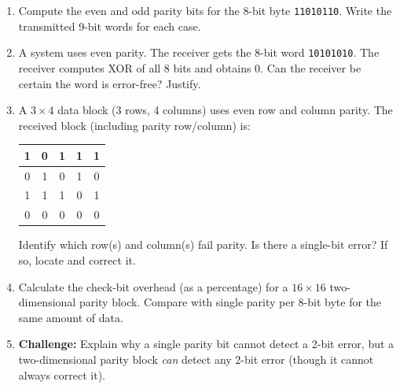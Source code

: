 \documentclass[11pt]{article}
\begin{document}
\begin{exercice}
\begin{enumerate}
\item Compute the even and odd parity bits for the 8-bit byte \texttt{11010110}. Write the transmitted 9-bit words for each case.
\item A system uses even parity. The receiver gets the 8-bit word \texttt{10101010}. The receiver computes XOR of all 8 bits and obtains 0. Can the receiver be certain the word is error-free? Justify.
\item A $3 \times 4$ data block (3 rows, 4 columns) uses even row and column parity. The received block (including parity row/column) is:
\begin{center}
\begin{tabular}{|c|c|c|c|c|}
\hline
\rowcolor{popblueL}
1 & 0 & 1 & 1 & 1 \\
\hline
0 & 1 & 0 & 1 & 0 \\
\hline
1 & 1 & 1 & 0 & 1 \\ \hline
0 & 0 & 0 & 0 & 0 \\
\hline
\end{tabular}
\end{center}
Identify which row(s) and column(s) fail parity. Is there a single-bit error? If so, locate and correct it.
\item Calculate the check-bit overhead (as a percentage) for a $16 \times 16$ two-dimensional parity block. Compare with single parity per 8-bit byte for the same amount of data.
\item \textbf{Challenge:} Explain why a single parity bit cannot detect a 2-bit error, but a two-dimensional parity block \emph{can} detect any 2-bit error (though it cannot always correct it).
\end{enumerate}
\end{exercice}
\end{document}
